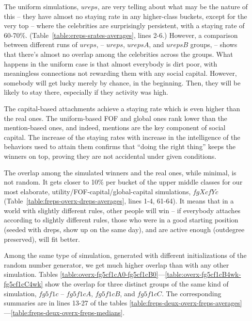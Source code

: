 \documentclass[10pt,oneside]{memoir}
\begin{document}
The uniform simulations, $ureps$, are very telling about what may be the nature of this -- they have almost no staying rate in any higher-class buckets, except for the very top -- where the celebrities are surprisingly persistent, with a staying rate of 60-70\%.  (Table~\ref{table:ereps-srates-averages}, lines 2-6.)  However, a comparison between different runs of $ureps$, -- $ureps$, $urepsA$, and $urepsB$ groups, -- shows that there's almost no overlap among the celebrities across the groups.  What happens in the uniform case is that almost everybody is dirt poor, with meaningless connections not rewarding them with any social capital.  However, somebody will get lucky merely by chance, in the beginning.  Then, they will be likely to stay there, especially if they activity was high.


The capital-based attachments achieve a staying rate which is even higher than the real ones.  The uniform-based FOF and global ones rank lower than the mention-based ones, and indeed, mentions are the key component of social capital.  The increase of the staying rates with increase in the intelligence of the behaviors used to attain them confirms that ``doing the right thing'' keeps the winners on top, proving they are not accidental under given conditions.


The overlap among the simulated winners and the real ones, while minimal, is not random.  It gets closer to 10\% per bucket of the upper middle classes for our most elaborate, utility/FOF-capital/global-capital simulations, $fgXcfYc$ (Table~\ref{table:freps-overx-dreps-averages}, lines 1-4, 61-64).  It means that in a world with slightly different rules, other people will win -- if everybody attaches according to slightly different rules, those who were in a good starting position (seeded with dreps, show up on the same day), and are active enough (outdegree preserved), will fit better.


Among the same type of simulation, generated with different initializations of the random number generator, we get much higher overlap than with any other simulation.  Tables \ref{table:overx-fg5cf1cA0-fg5cf1cB0}---\ref{table:overx-fg5cf1cB4wk-fg5cf1cC4wk} show the overlap for three distinct groups of the same kind of simulation, $fg5f1c$ -- $fg5f1cA$, $fg5f1cB$, and $fg5f1cC$.  The corresponding summaries are in lines 13-27 of the tables \ref{table:freps-deux-overx-freps-averages}---\ref{table:freps-deux-overx-freps-medians}.
\end{document}
